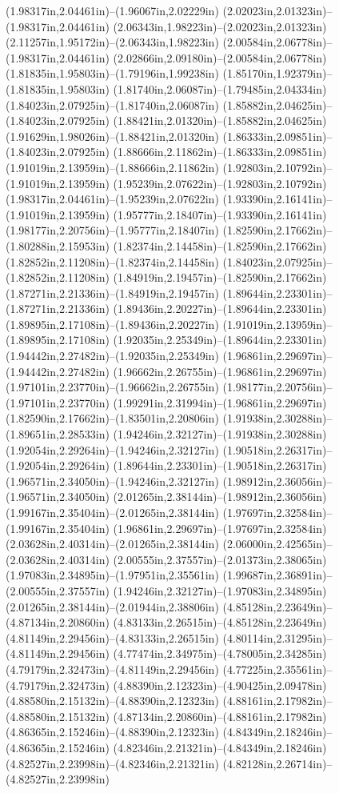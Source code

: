 (1.98317in,2.04461in)--(1.96067in,2.02229in) (2.02023in,2.01323in)--(1.98317in,2.04461in) (2.06343in,1.98223in)--(2.02023in,2.01323in) (2.11257in,1.95172in)--(2.06343in,1.98223in) (2.00584in,2.06778in)--(1.98317in,2.04461in) (2.02866in,2.09180in)--(2.00584in,2.06778in) (1.81835in,1.95803in)--(1.79196in,1.99238in) (1.85170in,1.92379in)--(1.81835in,1.95803in) (1.81740in,2.06087in)--(1.79485in,2.04334in) (1.84023in,2.07925in)--(1.81740in,2.06087in) (1.85882in,2.04625in)--(1.84023in,2.07925in) (1.88421in,2.01320in)--(1.85882in,2.04625in) (1.91629in,1.98026in)--(1.88421in,2.01320in) (1.86333in,2.09851in)--(1.84023in,2.07925in) (1.88666in,2.11862in)--(1.86333in,2.09851in) (1.91019in,2.13959in)--(1.88666in,2.11862in) (1.92803in,2.10792in)--(1.91019in,2.13959in) (1.95239in,2.07622in)--(1.92803in,2.10792in) (1.98317in,2.04461in)--(1.95239in,2.07622in) (1.93390in,2.16141in)--(1.91019in,2.13959in) (1.95777in,2.18407in)--(1.93390in,2.16141in) (1.98177in,2.20756in)--(1.95777in,2.18407in) (1.82590in,2.17662in)--(1.80288in,2.15953in) (1.82374in,2.14458in)--(1.82590in,2.17662in) (1.82852in,2.11208in)--(1.82374in,2.14458in) (1.84023in,2.07925in)--(1.82852in,2.11208in) (1.84919in,2.19457in)--(1.82590in,2.17662in) (1.87271in,2.21336in)--(1.84919in,2.19457in) (1.89644in,2.23301in)--(1.87271in,2.21336in) (1.89436in,2.20227in)--(1.89644in,2.23301in) (1.89895in,2.17108in)--(1.89436in,2.20227in) (1.91019in,2.13959in)--(1.89895in,2.17108in) (1.92035in,2.25349in)--(1.89644in,2.23301in) (1.94442in,2.27482in)--(1.92035in,2.25349in) (1.96861in,2.29697in)--(1.94442in,2.27482in) (1.96662in,2.26755in)--(1.96861in,2.29697in) (1.97101in,2.23770in)--(1.96662in,2.26755in) (1.98177in,2.20756in)--(1.97101in,2.23770in) (1.99291in,2.31994in)--(1.96861in,2.29697in) (1.82590in,2.17662in)--(1.83501in,2.20806in) (1.91938in,2.30288in)--(1.89651in,2.28533in) (1.94246in,2.32127in)--(1.91938in,2.30288in) (1.92054in,2.29264in)--(1.94246in,2.32127in) (1.90518in,2.26317in)--(1.92054in,2.29264in) (1.89644in,2.23301in)--(1.90518in,2.26317in) (1.96571in,2.34050in)--(1.94246in,2.32127in) (1.98912in,2.36056in)--(1.96571in,2.34050in) (2.01265in,2.38144in)--(1.98912in,2.36056in) (1.99167in,2.35404in)--(2.01265in,2.38144in) (1.97697in,2.32584in)--(1.99167in,2.35404in) (1.96861in,2.29697in)--(1.97697in,2.32584in) (2.03628in,2.40314in)--(2.01265in,2.38144in) (2.06000in,2.42565in)--(2.03628in,2.40314in) (2.00555in,2.37557in)--(2.01373in,2.38065in) (1.97083in,2.34895in)--(1.97951in,2.35561in) (1.99687in,2.36891in)--(2.00555in,2.37557in) (1.94246in,2.32127in)--(1.97083in,2.34895in) (2.01265in,2.38144in)--(2.01944in,2.38806in) (4.85128in,2.23649in)--(4.87134in,2.20860in) (4.83133in,2.26515in)--(4.85128in,2.23649in) (4.81149in,2.29456in)--(4.83133in,2.26515in) (4.80114in,2.31295in)--(4.81149in,2.29456in) (4.77474in,2.34975in)--(4.78005in,2.34285in) (4.79179in,2.32473in)--(4.81149in,2.29456in) (4.77225in,2.35561in)--(4.79179in,2.32473in) (4.88390in,2.12323in)--(4.90425in,2.09478in) (4.88580in,2.15132in)--(4.88390in,2.12323in) (4.88161in,2.17982in)--(4.88580in,2.15132in) (4.87134in,2.20860in)--(4.88161in,2.17982in) (4.86365in,2.15246in)--(4.88390in,2.12323in) (4.84349in,2.18246in)--(4.86365in,2.15246in) (4.82346in,2.21321in)--(4.84349in,2.18246in) (4.82527in,2.23998in)--(4.82346in,2.21321in) (4.82128in,2.26714in)--(4.82527in,2.23998in) 